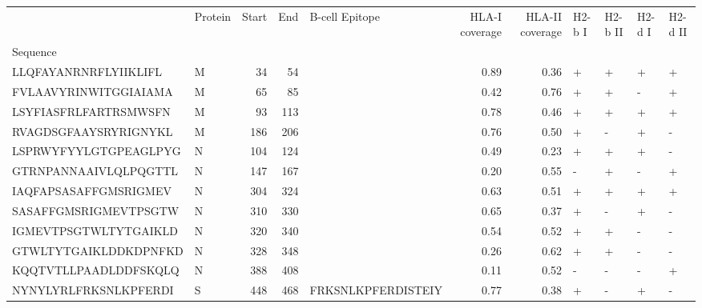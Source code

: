 \begin{tabular}{llrrlrrllll}
\toprule
{} & Protein &  Start &   End &      B-cell Epitope &  HLA-I coverage &  HLA-II coverage & H2-b I & H2-b II & H2-d I & H2-d II \\
Sequence              &         &        &       &                     &                 &                  &        &         &        &         \\
\midrule
LLQFAYANRNRFLYIIKLIFL &       M &     34 &    54 &                     &            0.89 &             0.36 &      + &       + &      + &       + \\
FVLAAVYRINWITGGIAIAMA &       M &     65 &    85 &                     &            0.42 &             0.76 &      + &       + &      - &       + \\
LSYFIASFRLFARTRSMWSFN &       M &     93 &   113 &                     &            0.78 &             0.46 &      + &       + &      + &       + \\
RVAGDSGFAAYSRYRIGNYKL &       M &    186 &   206 &                     &            0.76 &             0.50 &      + &       - &      + &       - \\
LSPRWYFYYLGTGPEAGLPYG &       N &    104 &   124 &                     &            0.49 &             0.23 &      + &       + &      + &       - \\
GTRNPANNAAIVLQLPQGTTL &       N &    147 &   167 &                     &            0.20 &             0.55 &      - &       + &      - &       + \\
IAQFAPSASAFFGMSRIGMEV &       N &    304 &   324 &                     &            0.63 &             0.51 &      + &       + &      + &       + \\
SASAFFGMSRIGMEVTPSGTW &       N &    310 &   330 &                     &            0.65 &             0.37 &      + &       - &      + &       - \\
IGMEVTPSGTWLTYTGAIKLD &       N &    320 &   340 &                     &            0.54 &             0.52 &      + &       + &      - &       - \\
GTWLTYTGAIKLDDKDPNFKD &       N &    328 &   348 &                     &            0.26 &             0.62 &      + &       + &      - &       - \\
KQQTVTLLPAADLDDFSKQLQ &       N &    388 &   408 &                     &            0.11 &             0.52 &      - &       - &      - &       + \\
NYNYLYRLFRKSNLKPFERDI &       S &    448 &   468 &  FRKSNLKPFERDISTEIY &            0.77 &             0.38 &      + &       - &      + &       - \\

\end{tabular}
